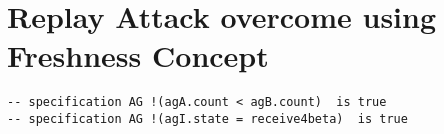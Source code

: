 \begin{appendix}
{\begin{verbatim}
\end{verbatim}

\section{Replay Attack overcome using Freshness Concept}

\begin{verbatim}
-- specification AG !(agA.count < agB.count)  is true
-- specification AG !(agI.state = receive4beta)  is true

\end{verbatim}

}
\end{appendix}
